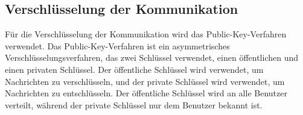 \subsection{Verschlüsselung der Kommunikation}


Für die Verschlüsselung der Kommunikation wird das Public-Key-Verfahren verwendet.
Das Public-Key-Verfahren ist ein asymmetrisches Verschlüsselungsverfahren, das zwei Schlüssel verwendet,
einen öffentlichen und einen privaten Schlüssel. Der öffentliche Schlüssel wird verwendet, um Nachrichten
zu verschlüsseln, und der private Schlüssel wird verwendet, um Nachrichten zu entschlüsseln. Der öffentliche
Schlüssel wird an alle Benutzer verteilt, während der private Schlüssel nur dem Benutzer bekannt ist.


